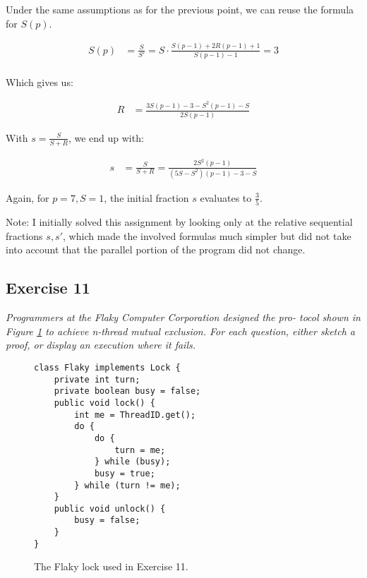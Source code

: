 \documentclass[a4paper,10pt]{article}
\begin{document}
\vspace{3mm}

Under the same assumptions as for the previous point, we can reuse the formula
for $S(p)$.

\begin{align}
S(p) &= \frac{S}{S'} = S \cdot \frac{S(p - 1) + 2R(p - 1) + 1}{S(p - 1) - 1} = 3 \\
\end{align}

Which gives us:

\begin{align}
R &= \frac{3S(p-1) - 3 - S^2(p-1) - S}{2S(p-1)}
\end{align}

With $s = \frac{S}{S+R}$, we end up with:

\begin{align}
s &= \frac{S}{S+R} = \frac{2S^2(p-1)}{(5S-S^2)(p-1) - 3 - S}
\end{align}

Again, for $p = 7, S = 1$, the initial fraction $s$ evaluates to $\frac{3}{5}$.

Note: I initially solved this assignment by looking only at the relative sequential
fractions $s, s'$, which made the involved formulas much simpler but did not take into
account that the parallel portion of the program did not change.

\subsection{Exercise 11}

\emph{Programmers at the Flaky Computer Corporation designed the pro-
tocol shown in Figure \ref{fig:flaky} to achieve n-thread mutual exclusion. For each question,
either sketch a proof, or display an execution where it fails.}

\begin{figure}
\begin{lstlisting}
class Flaky implements Lock {
    private int turn;
    private boolean busy = false;
    public void lock() {
        int me = ThreadID.get();
        do {
            do {
                turn = me;
            } while (busy);
            busy = true;
        } while (turn != me);
    }
    public void unlock() {
        busy = false;
    }
}
\end{lstlisting}
\caption{The Flaky lock used in Exercise 11.}
\label{fig:flaky}
\end{figure}
\end{document}
